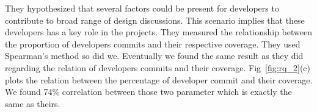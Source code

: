 They hypothesized that several factors could be present for developers to contribute to broad range of design discussions. This scenario implies that these developers has a key role in the projects. They measured the relationship between the proportion of developers commits and their respective coverage. They used Spearman's method so did we. Eventually we found the same result as they did regarding the relation of developers commits and their coverage. Fig~\ref{fig:rq_2}(c) plots the relation between the percentage of developer commit and their coverage. We found 74\% correlation between those two parameter which is exactly the same as theirs.     
   